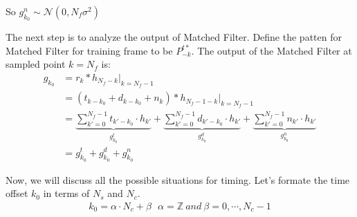 \documentclass[a4paper]{report}
\begin{document}
So $g^n_{k_0}\sim \mathcal{N} (0, N_f \sigma^2)$

The next step is to analyze the output of Matched Filter. 
Define the patten for Matched Filter for training frame to be $P^{t*}_{-k}$.
The output of the Matched Filter at sampled point $k=N_f$ is:
\begin{align}
	g_{k_0} 
	&= r_k \ast h_{N_f - k} \bigg|_{k = N_f-1}\\
	&= (t_{k - k_0} + d_{k - k_0} + n_k) \ast h_{N_f -1- k} \bigg|_{k = N_f-1}\\
	&= \underbrace{\sum_{k' = 0}^{N_f-1} t_{k'-k_0}\cdot h_{k'}}_{g^t_{k_0}} + \underbrace{\sum_{k' = 0}^{N_f-1} d_{k'-k_0}\cdot h_{k'}}_{g^d_{k_0}} + \underbrace{\sum_{k' = 0}^{N_f-1} n_{k'}\cdot h_{k'}}_{g^n_{k_0}}\\
	&= g^t_{k_0} + g^d_{k_0} + g^n_{k_0}
\end{align}

Now, we will discuss all the possible situations for timing. 
Let's formate the time offset $k_0$ in terms of $N_s$ and $N_c$.
\begin{align}
	k_0 = \alpha \cdot N_c + \beta ~~~ \alpha = \mathbb{Z}~and~\beta = 0, \cdots, N_c - 1
\end{align}
\end{document}
